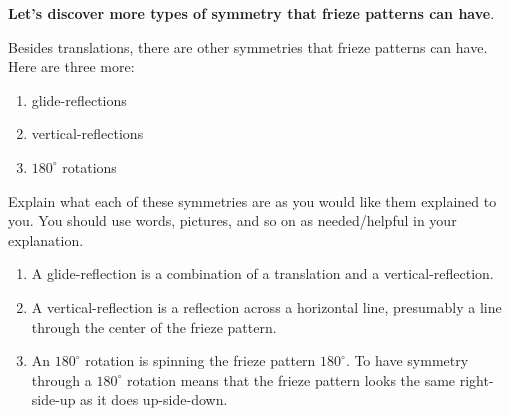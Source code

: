 \documentclass[noauthor,nooutcomes,hints,handout]{../ximera}
\begin{document}
\textbf{Let's discover more types of symmetry that
  frieze patterns can have}.





\mynewpage



\begin{question}
  Besides translations, there are other symmetries that frieze
  patterns can have. Here are three more:
  \begin{enumerate}
  \item glide-reflections
  \item vertical-reflections
  \item $180^\circ$ rotations
  \end{enumerate}
Explain what each of these symmetries are as you
  would like them explained to you. You should use words, pictures,
  and so on as needed/helpful in your explanation.
  \begin{freeResponse}
    \begin{enumerate}
    \item A glide-reflection is a combination of a translation and a
      vertical-reflection.
    \item A vertical-reflection is a reflection across a horizontal
      line, presumably a line through the center of the frieze
      pattern.
    \item An $180^\circ$ rotation is spinning the frieze pattern
      $180^\circ$. To have symmetry through a $180^\circ$ rotation
      means that the frieze pattern looks the same right-side-up as it
      does up-side-down.
    \end{enumerate}
  \end{freeResponse}
\end{question}

\mynewpage
\end{document}

